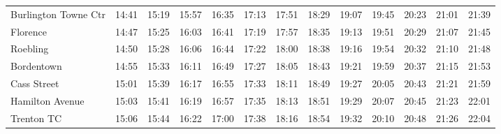 \begin{center}
\begin{tabular}{@{}lrrrrrrrrrrrr@{}}
Burlington Towne Ctr & 14:41 & 15:19 & 15:57 & 16:35 & 17:13 & 17:51 & 18:29 & 19:07 & 19:45 & 20:23 & 21:01 & 21:39 \\
Florence & 14:47 & 15:25 & 16:03 & 16:41 & 17:19 & 17:57 & 18:35 & 19:13 & 19:51 & 20:29 & 21:07 & 21:45 \\
Roebling & 14:50 & 15:28 & 16:06 & 16:44 & 17:22 & 18:00 & 18:38 & 19:16 & 19:54 & 20:32 & 21:10 & 21:48 \\
Bordentown & 14:55 & 15:33 & 16:11 & 16:49 & 17:27 & 18:05 & 18:43 & 19:21 & 19:59 & 20:37 & 21:15 & 21:53 \\
Cass Street & 15:01 & 15:39 & 16:17 & 16:55 & 17:33 & 18:11 & 18:49 & 19:27 & 20:05 & 20:43 & 21:21 & 21:59 \\
Hamilton Avenue & 15:03 & 15:41 & 16:19 & 16:57 & 17:35 & 18:13 & 18:51 & 19:29 & 20:07 & 20:45 & 21:23 & 22:01 \\
Trenton TC & 15:06 & 15:44 & 16:22 & 17:00 & 17:38 & 18:16 & 18:54 & 19:32 & 20:10 & 20:48 & 21:26 & 22:04 \\
\bottomrule\end{tabular}\end{center}
